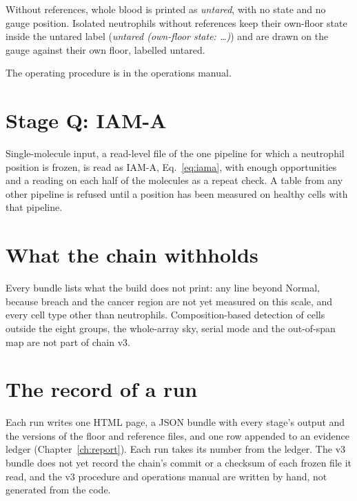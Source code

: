 Without references, whole blood is printed as \emph{untared}, with no state and no gauge position. Isolated neutrophils without references keep their own-floor
state inside the untared label (\emph{untared (own-floor state: \dots)}) and are drawn on the gauge against their own floor, labelled untared.

The operating procedure is in the operations manual.



\section{Stage Q: IAM-A}

Single-molecule input, a read-level file of the one pipeline for which a neutrophil position is frozen, is read as IAM-A,
Eq.~\eqref{eq:iama}, with enough opportunities and a reading on each half of the molecules as a repeat check. A table from
any other pipeline is refused until a position has been measured on healthy cells with that pipeline.

\section{What the chain withholds}

Every bundle lists what the build does not print: any line beyond Normal, because breach and the cancer region are not yet measured on this scale, and every
cell type other than neutrophils.
Composition-based detection of cells outside the eight groups, the whole-array sky, serial mode and the out-of-span map are not part of chain v3. \openprob

\section{The record of a run}

Each run writes one HTML page, a JSON bundle with every stage's output and the versions of the floor and reference files, and one row appended to an evidence
ledger (Chapter~\ref{ch:report}). Each run takes its number from the ledger. The v3 bundle does not yet record the chain's commit or a checksum of each
frozen file it read, and the v3 procedure and operations manual are written by hand, not generated from the code. \openprob
